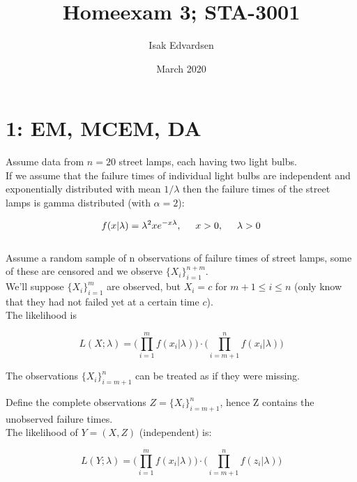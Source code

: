 \documentclass{article}
\title{Homeexam 3; STA-3001}
\author{Isak Edvardsen }
\date{March 2020}
\begin{document}
\maketitle

\section{1: EM, MCEM, DA}

\vspace{0.5cm}

Assume data from $n=20$ street lamps, each having two light bulbs.\\

If we assume that the failure times of individual light bulbs are independent and exponentially distributed with mean $1/\lambda$ then the failure times of the street lamps is gamma distributed (with $\alpha = 2$):

\begin{equation}
    f(x|\lambda) = \lambda^2 x e^{-x\lambda}, \hspace{.5cm} x>0, \hspace{.5cm} \lambda >0
\end{equation} 
\\

\noindent Assume a random sample of n observations of failure times of street lamps, some of these are censored and we observe $\{ X_i\}_{i=1}^{n+m}$. \\

\noindent We'll suppose $\{ X_i \}_{i=1}^m$ are observed, but $X_i = c$ for $m + 1 \leq i \leq n$ (only know that they had not failed yet at a certain time $c$).\\

The likelihood is

\begin{equation}
    L(X;\lambda) = \bigg( \prod_{i=1}^{m} f(x_i|\lambda) \bigg) \cdot \bigg( \prod_{i=m+1}^{n} f(x_i|\lambda) \bigg)
\end{equation}


The observations $\{ X_i \}_{i=m+1}^n$ can be treated as if they were missing.


Define the complete observations $Z = \{ X_i \}_{i=m+1}^{n}$, hence Z contains the unobserved failure times. \\

The likelihood of $Y = (X,Z)$ (independent) is:

\begin{equation}
    L(Y;\lambda) = \bigg( \prod_{i=1}^{m} f(x_i|\lambda) \bigg) \cdot \bigg( \prod_{i=m+1}^{n} f(z_i|\lambda) \bigg)
\end{equation}
\end{document}
